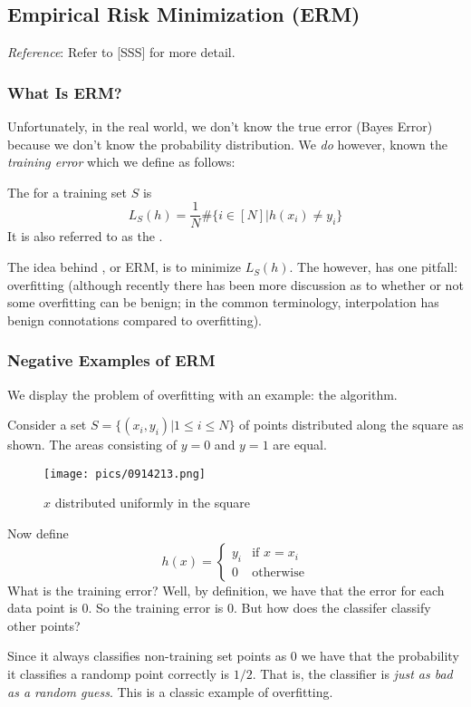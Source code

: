 \documentclass[11pt]{scrartcl}
\begin{document}
\subsection{Empirical Risk Minimization (ERM)}
\textit{Reference}: Refer to [SSS] for more detail. 

\subsubsection{What Is ERM?}
Unfortunately, in the real world, we don't know the true error (Bayes Error) because we don't know the probability distribution. We \textit{do} however, known the \textit{training error} which we define as follows:
\begin{defn}
The  for a training set $S$ is $$L_{S}(h) = \frac{1}{N}\#\{i \in [N] | h(x_i) \ne y_i\}$$ It is also referred to as the .
\end{defn}

The idea behind , or ERM, is to minimize $L_{S}(h)$. The  however, has one pitfall: overfitting (although recently there has been more discussion as to whether or not some overfitting can be benign; in the common terminology, interpolation has benign connotations compared to overfitting).

\subsubsection{Negative Examples of ERM}
We display the problem of overfitting with an example: the  algorithm. 

Consider a set $S=\{(x_i,y_i)| 1 \le i \le N\}$ of points distributed along the square as shown. The areas consisting of $y=0$ and $y=1$ are equal. 
\begin{figure}[h!]
    \centering
    \texttt{[image: pics/0914213.png]}
    \caption{$x$ distributed uniformly in the square}
\end{figure}

Now define $$h(x)=\begin{cases} y_i & \text{if } x = x_i \\ 0 & \text{otherwise}\end{cases}$$
What is the training error? Well, by definition, we have that the error for each data point is $0$. So the training error is $0$. But how does the classifer classify other points? 

Since it always classifies non-training set points as $0$ we have that the probability it classifies a randomp point correctly is $1/2$. That is, the classifier is \textit{just as bad as a random guess}. This is a classic example of overfitting. 
\end{document}
